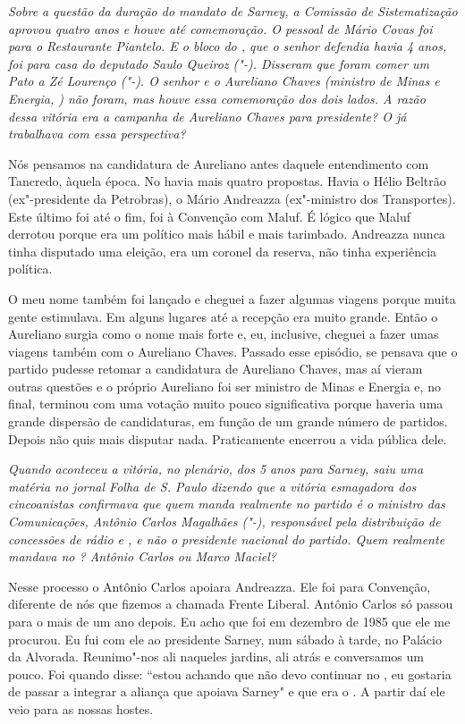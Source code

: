 \medskip

\noindent\emph{Sobre a questão da duração do mandato de Sarney, a Comissão de
Sistematização aprovou quatro anos e houve até comemoração. O pessoal de
Mário Covas foi para o Restaurante Piantelo. E o bloco do , que o
senhor defendia havia 4 anos, foi para casa do deputado Saulo Queiroz
("-). Disseram que foram comer um Pato a Zé Lourenço
("-). O senhor e o Aureliano Chaves (ministro de Minas e Energia,
) não foram, mas houve essa comemoração dos dois lados. A razão dessa
vitória era a campanha de Aureliano Chaves para presidente? O  já
trabalhava com essa perspectiva?}

Nós pensamos na candidatura de Aureliano antes daquele
entendimento com Tancredo, àquela época. No  havia mais quatro
propostas. Havia o Hélio Beltrão (ex"-presidente da Petrobras), o Mário
Andreazza (ex"-ministro dos Transportes). Este último foi até o fim, foi
à Convenção com Maluf. É lógico que Maluf derrotou porque era um
político mais hábil e mais tarimbado. Andreazza nunca tinha disputado
uma eleição, era um coronel da reserva, não tinha experiência política.

O meu nome também foi lançado e cheguei a fazer algumas viagens porque
muita gente estimulava. Em alguns lugares até a recepção era muito
grande. Então o Aureliano surgia como o nome mais forte e, eu,
inclusive, cheguei a fazer umas viagens também com o Aureliano Chaves.
Passado esse episódio, se pensava que o partido pudesse retomar a
candidatura de Aureliano Chaves, mas aí vieram outras questões e o
próprio Aureliano foi ser ministro de Minas e Energia e, no final,
terminou com uma votação muito pouco significativa porque haveria uma
grande dispersão de candidaturas, em função de um grande número de
partidos. Depois não quis mais disputar nada. Praticamente encerrou a
vida pública dele.

\medskip

\noindent\emph{Quando aconteceu a vitória, no plenário, dos 5 anos para Sarney,
saiu uma matéria no jornal Folha de S. Paulo dizendo que a vitória
esmagadora dos cincoanistas confirmava que quem manda realmente no
partido é o ministro das Comunicações, Antônio Carlos Magalhães
("-), responsável pela distribuição de concessões de rádio e , e
não o presidente nacional do partido. Quem realmente mandava no ?
Antônio Carlos ou Marco Maciel? }

Nesse processo o Antônio Carlos apoiara Andreazza. Ele
foi para Convenção, diferente de nós que fizemos a chamada Frente
Liberal. Antônio Carlos só passou para o  mais de um ano depois. Eu
acho que foi em dezembro de 1985 que ele me procurou. Eu fui com ele ao
presidente Sarney, num sábado à tarde, no Palácio da Alvorada.
Reunimo"-nos ali naqueles jardins, ali atrás e conversamos um pouco. Foi
quando  disse: ``estou achando que não devo continuar no , eu
gostaria de passar a integrar a aliança que apoiava Sarney" e que era o
. A partir daí ele veio para as nossas hostes.


